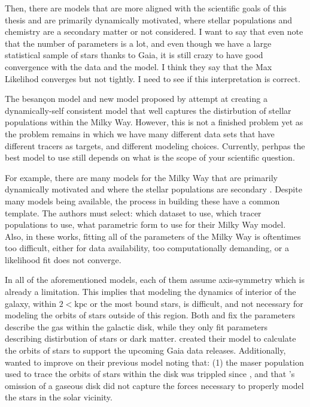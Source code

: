         Then, there are models that are more aligned with the scientific goals of this thesis and are primarily dynamically motivated, where stellar populations and chemistry are a secondary matter or not considered. I want to say that even \citet{2024MNRAS.527.1915B} note that the number of parameters is a lot, and even though we have a large statistical sample of stars thanks to Gaia, it is still crazy to have good convergence with the data and the model. I think they say that the Max Likelihod converges but not tightly. I need to see if this interpretation is correct. 

        The besançon model and new model proposed by \citet{2024MNRAS.527.1915B} attempt at creating a dynamically-self consistent model that well captures the distirbution of stellar populations within the Milky Way. However, this is not a finished problem yet as the problem remains in which we have many different data sets that have different tracers as targets, and different modeling choices. Currently, perhpas the best model to use still depends on what is the scope of your scientific question. 

        For example, there are many models for the Milky Way that are primarily dynamically motivated and where the stellar populations are secondary \citep{1991RMxAA..22..255A,2015ApJS..216...29B,2017MNRAS.465...76M,2017A&A...598A..66P,2024ApJ...967...89I}. Despite many models being available, the process in building these have a common template. The authors must select: which dataset to use, which tracer populations to use, what parametric form to use for their Milky Way model. Also, in these works, fitting all of the parameters of the Milky Way is oftentimes too difficult, either for data availability, too computationally demanding, or a likelihood fit does not converge. 

        In all of the aforementioned models, each of them assume axis-symmetry which is already a limitation. This implies that modeling the dynamics of interior of the galaxy, within $2<\mathrm{kpc}$ or the most bound stars, is difficult, and not necessary for modeling the orbits of stars outside of this region. Both \citet{2017MNRAS.465...76M} and \citet{2024MNRAS.527.1915B} fix the parameters describe the gas within the galactic disk, while they only fit parameters describing distirbution of stars or dark matter. \citet{2017MNRAS.465...76M} created their model to calculate the orbits of stars to support the upcoming Gaia data releases. Additionally, \citet{2017MNRAS.465...76M}  wanted to improve on their previous model noting that: (1) the maser population used to trace the orbits of stars within the disk was trippled since \citet{2011MNRAS.414.2446M}, and that \citet{2011MNRAS.414.2446M}'s omission of a gaseous disk did not capture the forces necessary to properly model the stars in the solar vicinity. 

